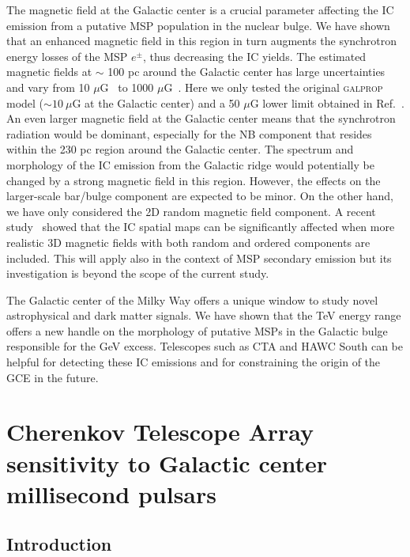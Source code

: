 \documentclass[doublespace,nopageskip]{VTthesis} %
\begin{document}
The magnetic field at the Galactic center is a crucial parameter affecting the IC emission from a putative MSP population in the nuclear bulge. We have shown that an enhanced magnetic field in this region in turn augments the synchrotron energy losses of the MSP $e^\pm$, thus decreasing the IC yields. The estimated magnetic fields at $\sim$ 100 pc around the Galactic center has large uncertainties and vary from 10 $\mu$G~\cite{LaRosa:2005ai} to 1000 $\mu$G~\cite{Morris1989fd}. Here we only tested the original \textsc{galprop} model ($\sim 10\ \mu$G at the Galactic center) and a 50 $\mu$G lower limit obtained in Ref.~\cite{Crocker:2010xc}. An even larger magnetic field at the Galactic center means that the synchrotron radiation would be dominant, especially for the NB component that resides within the 230 pc region around the Galactic center. The spectrum and morphology of the IC emission from the Galactic ridge would potentially be changed by a strong magnetic field in this region. However, the effects on the larger-scale bar/bulge component are expected to be minor. On the other hand, we have only considered the 2D random magnetic field component. A recent study~\cite{Orlando:2019vmq} showed that the IC spatial maps can be significantly affected when more realistic 3D magnetic fields with both random and ordered components are included. This will apply also in the context of MSP secondary emission but its investigation is beyond the scope of the current study.

The Galactic center of the Milky Way offers a unique window to study novel astrophysical and dark matter signals. We have shown that the TeV energy range offers a new handle on the morphology of putative MSPs in the Galactic bulge responsible for the GeV excess. Telescopes such as CTA and HAWC South can be helpful for detecting these IC emissions and for constraining the origin of the GCE in the future.

\chapter{Cherenkov Telescope Array sensitivity to Galactic center millisecond pulsars}\label{ch:CTA}
\section{Introduction}
\label{sec:introduction}
\end{document}
